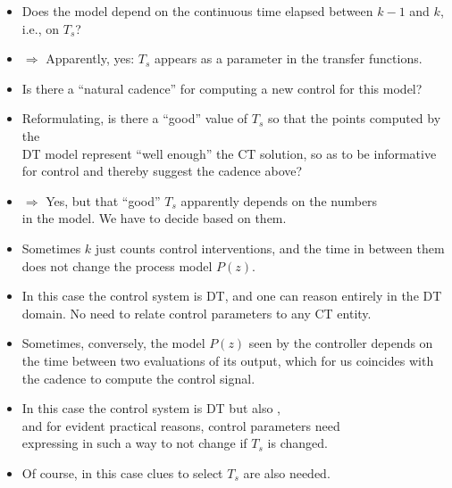 \begin{frame}
\myPause
 \begin{itemize}[<+-| alert@+>]
 \item Does the model depend on the continuous time elapsed between $k-1$ and $k$,\\
       i.e., on $T_s$?
 \item[] $\Rightarrow$ Apparently, yes: $T_s$ appears as a parameter in the transfer functions.
 \item Is there a ``natural cadence'' for computing a new control for this model?
 \item Reformulating, is there a ``good'' value of $T_s$ so that the points computed by the\\
       DT model represent ``well enough'' the CT solution, so as to be informative\\
       for control and thereby suggest the cadence above?
 \item[] $\Rightarrow$ Yes, but that ``good'' $T_s$ apparently depends on the numbers\\
       \hspace{5.5mm}in the model. We have to decide based on them.
 \end{itemize}
\end{frame}

\begin{frame}
\framesubtitleTC{}
\myPause
 \begin{itemize}[<+-| alert@+>]
 \item Sometimes $k$ just counts control interventions, and the time in between them does not change the process
       model $P(z)$.
 \item In this case the control system is DT, and one can reason entirely in the DT domain. No need to relate
       control parameters to any CT entity.
 \item \vspace{3mm}Sometimes, conversely, the model $P(z)$ seen by the controller depends on the time between
       two evaluations of its output, which for us coincides with the cadence to compute the control signal.
 \item In this case the control system is DT but also ,\\ 
       and for evident practical reasons, control parameters need\\
       expressing in such a way to not change if $T_s$ is changed.
 \item Of course, in this case clues to select $T_s$ are also needed.
 \end{itemize}
\end{frame}

